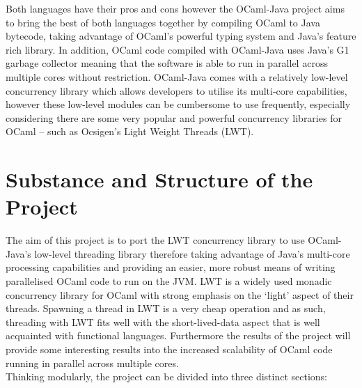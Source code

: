 \documentclass[a4paper]{article}
\begin{document}
Both languages have their pros and cons however the OCaml-Java project aims to bring the best of both languages together by compiling OCaml to Java bytecode, taking advantage of OCaml's powerful typing system and Java's feature rich library. In addition, OCaml code compiled with OCaml-Java uses Java's G1 garbage collector meaning that the software is able to run in parallel across multiple cores without restriction. OCaml-Java comes with a relatively low-level concurrency library which allows developers to utilise its multi-core capabilities, however these low-level modules can be cumbersome to use frequently, especially considering there are some very popular and powerful concurrency libraries for OCaml -- such as Ocsigen's Light Weight Threads (LWT).

\section{Substance and Structure of the Project}
\label{sec:substance}
The aim of this project is to port the LWT concurrency library to use OCaml-Java's low-level threading library therefore taking advantage of Java's multi-core processing capabilities and providing an easier, more robust means of writing parallelised OCaml code to run on the JVM. LWT is a widely used monadic concurrency library for OCaml with strong emphasis on the `light' aspect of their threads. Spawning a thread in LWT is a very cheap operation and as such, threading with LWT fits well with the short-lived-data aspect that is well acquainted with functional languages. Furthermore the results of the project will provide some interesting results into the increased scalability of OCaml code running in parallel across multiple cores.\\
Thinking modularly, the project can be divided into three distinct sections:
\end{document}
